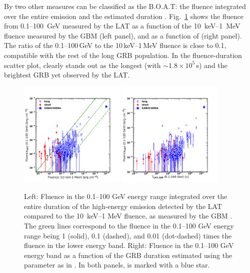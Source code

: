 \documentclass[preprint]{aastex631}
\begin{document}
By two other measures \grb can be classified as the B.O.A.T: the fluence integrated over the entire emission and the estimated duration \toz.
Fig.~\ref{fig:fluence_duration} shows the fluence from 0.1--100~GeV measured by the LAT as a function of the 10~keV--1~MeV fluence measured by the GBM (left panel), and as a function of \toz (right panel). 
The ratio of the 0.1--100\,GeV to the 10\,keV--1\,MeV fluence is close to 0.1, compatible with the rest of the long GRB population. 
In the fluence-duration scatter plot, \grb clearly stands out as the longest (with \toz$\sim 1.8 \times10^{5}$\,s) and the brightest GRB yet observed by the LAT.

\begin{figure}[t]
    \centering    
    \includegraphics[width=0.45\textwidth]{GBMFLUENCE_LATFLUENCE_AG.pdf}
    \includegraphics[width=0.45\textwidth]{LATT90_LIKE_LAT_FLUENCE_ENE.pdf}
    \caption{Left: Fluence in the 0.1--100 GeV energy range integrated over the entire duration of the high-energy emission detected by the LAT compared to the 10~keV--1 MeV fluence, as measured by the GBM \citep{2023ApJ...952L..42L}. 
    The green lines correspond to the fluence in the 0.1--100 GeV energy range being 1 (solid), 0.1 (dashed), and 0.01 (dot-dashed) times the fluence in the lower energy band.
    Right: Fluence in the 0.1--100 GeV energy band as a function of the GRB duration estimated using the \toz parameter as in \citet{2FLGC}. In both panels, \grb is marked with a blue star.}
    \label{fig:fluence_duration}
\end{figure}
\end{document}

